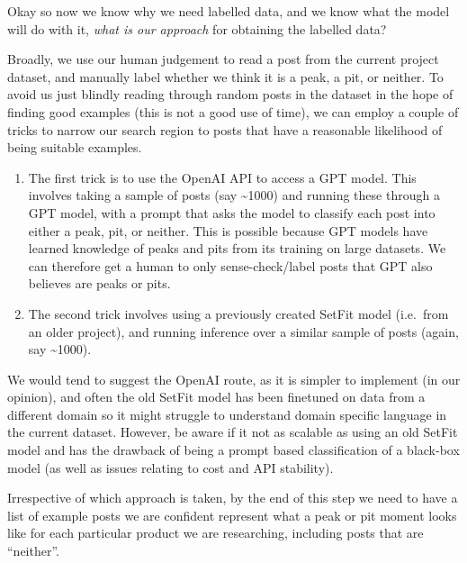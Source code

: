 \documentclass[
  letterpaper,
  DIV=11,
  numbers=noendperiod]{scrreprt}
\begin{document}
Okay so now we know why we need labelled data, and we know what the
model will do with it, \emph{what is our approach} for obtaining the
labelled data?

Broadly, we use our human judgement to read a post from the current
project dataset, and manually label whether we think it is a peak, a
pit, or neither. To avoid us just blindly reading through random posts
in the dataset in the hope of finding good examples (this is not a good
use of time), we can employ a couple of tricks to narrow our search
region to posts that have a reasonable likelihood of being suitable
examples.

\begin{enumerate}
\def\labelenumi{\arabic{enumi})}
\item
  The first trick is to use the OpenAI API to access a GPT model. This
  involves taking a sample of posts (say \textasciitilde1000) and
  running these through a GPT model, with a prompt that asks the model
  to classify each post into either a peak, pit, or neither. This is
  possible because GPT models have learned knowledge of peaks and pits
  from its training on large datasets. We can therefore get a human to
  only sense-check/label posts that GPT also believes are peaks or pits.
\item
  The second trick involves using a previously created SetFit model
  (i.e.~from an older project), and running inference over a similar
  sample of posts (again, say \textasciitilde1000).
\end{enumerate}

We would tend to suggest the OpenAI route, as it is simpler to implement
(in our opinion), and often the old SetFit model has been finetuned on
data from a different domain so it might struggle to understand domain
specific language in the current dataset. However, be aware if it not as
scalable as using an old SetFit model and has the drawback of being a
prompt based classification of a black-box model (as well as issues
relating to cost and API stability).

Irrespective of which approach is taken, by the end of this step we need
to have a list of example posts we are confident represent what a peak
or pit moment looks like for each particular product we are researching,
including posts that are ``neither''.
\end{document}
